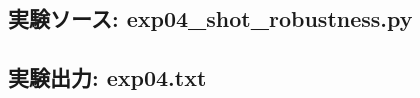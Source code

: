 \subsection{実験ソース: exp04\_shot\_robustness.py}

{\small

}

\subsection{実験出力: exp04.txt}

{\small

}
